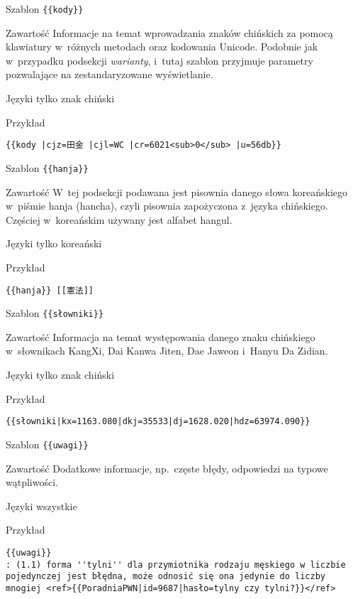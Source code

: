 \spacer
\begin{opis}
	\item[Szablon] \verb|{{kody}}|
	\item[Zawartość] Informacje na temat wprowadzania znaków chińskich za pomocą klawiatury w~różnych metodach oraz kodowania Unicode. Podobnie jak w~przypadku podsekcji \emph{warianty}, i~tutaj szablon przyjmuje parametry pozwalające na zestandaryzowane wyświetlanie.
	\item[Języki] tylko znak chiński
	\item[Przykład]
\begin{lstlisting}
{{kody |cjz=田金 |cjl=WC |cr=6021<sub>0</sub> |u=56db}}
\end{lstlisting}
\end{opis}
\spacer
\begin{opis}
	\item[Szablon] \verb|{{hanja}}|
	\item[Zawartość] W~tej podsekcji podawana jest pisownia danego słowa koreańskiego w~piśmie hanja (hancha), czyli pisownia zapożyczona z~języka chińskiego. Częściej w~koreańskim używany jest alfabet hangul.
	\item[Języki] tylko koreański
	\item[Przykład]
\begin{lstlisting}
{{hanja}} [[憲法]]
\end{lstlisting}
\end{opis}
\spacer
\begin{opis}
	\item[Szablon] \verb|{{słowniki}}|
	\item[Zawartość] Informacja na temat występowania danego znaku chińskiego w~słownikach KangXi, Dai Kanwa Jiten, Dae Jaweon i~Hanyu Da Zidian.
	\item[Języki] tylko znak chiński
	\item[Przykład]
\begin{lstlisting}
{{słowniki|kx=1163.080|dkj=35533|dj=1628.020|hdz=63974.090}}
\end{lstlisting}
\end{opis}
\spacer
\begin{opis}
	\item[Szablon] \verb|{{uwagi}}|
	\item[Zawartość] Dodatkowe informacje, np.\ częste błędy, odpowiedzi na typowe wątpliwości.
	\item[Języki] wszystkie
	\item[Przykład]
\begin{lstlisting}
{{uwagi}}
: (1.1) forma ''tylni'' dla przymiotnika rodzaju męskiego w liczbie pojedynczej jest błędna, może odnosić się ona jedynie do liczby mnogiej <ref>{{PoradniaPWN|id=9687|hasło=tylny czy tylni?}}</ref>
\end{lstlisting}
\end{opis}
